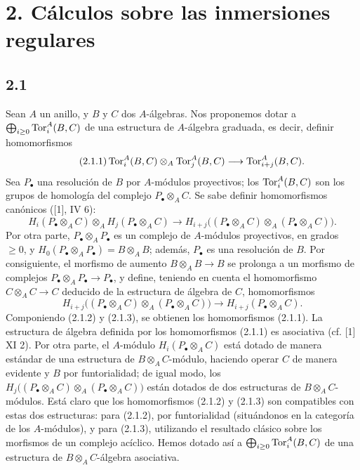 \providecommand{\sisi}[2]{#2}

\section*{2. Cálculos sobre las inmersiones regulares}

\subsection*{2.1}
Sean \(A\) un anillo, y \(B\) y \(C\) dos \(A\)-álgebras. Nos proponemos dotar a \(\bigoplus_{i\ge0}\operatorname{Tor}_i^A(B,C)\) de una estructura de \(A\)-álgebra graduada, es decir, definir homomorfismos
\begin{equation}\tag{2.1.1}
 \operatorname{Tor}_i^A(B,C)\otimes_A\operatorname{Tor}_j^A(B,C)\longrightarrow \operatorname{Tor}_{i+j}^A(B,C).
\end{equation}
Sea \(P_\bullet\) una resolución de \(B\) por \(A\)-módulos proyectivos; los \(\operatorname{Tor}_i^A(B,C)\) son los grupos de homología del complejo \(P_\bullet\otimes_A C\). Se sabe definir homomorfismos canónicos ([1], IV 6):
\begin{equation}\tag{2.1.2}
 H_i(P_\bullet\otimes_A C)\otimes_A H_j(P_\bullet\otimes_A C)
 \longrightarrow H_{i+j}\bigl((P_\bullet\otimes_A C)\otimes_A(P_\bullet\otimes_A C)\bigr).
\end{equation}
Por otra parte, \(P_\bullet\otimes_A P_\bullet\) es un complejo de \(A\)-módulos proyectivos, en grados \(\geq0\), y \(H_0(P_\bullet\otimes_A P_\bullet)=B\otimes_A B\); además, \(P_\bullet\) es una resolución de \(B\). Por consiguiente, el morfismo de aumento \(B\otimes_A B\to B\) se prolonga a un morfismo de complejos \(P_\bullet\otimes_A P_\bullet\to P_\bullet\), y define, teniendo en cuenta el homomorfismo \(C\otimes_A C\to C\) deducido de la estructura de álgebra de \(C\), homomorfismos
\begin{equation}\tag{2.1.3}
 H_{i+j}\bigl((P_\bullet\otimes_A C)\otimes_A(P_\bullet\otimes_A C)\bigr)
 \longrightarrow H_{i+j}(P_\bullet\otimes_A C).
\end{equation}
Componiendo (2.1.2) y (2.1.3), se obtienen los homomorfismos (2.1.1). La estructura de álgebra definida por los homomorfismos (2.1.1) es asociativa (cf. [1] XI 2). Por otra parte, el \(A\)-módulo \(H_i(P_\bullet\otimes_A C)\) está dotado de manera estándar de una estructura de \(B\otimes_A C\)-módulo, haciendo operar \(C\) de manera evidente y \(B\) por funtorialidad; de igual modo, los \(H_j\bigl((P_\bullet\otimes_A C)\otimes_A(P_\bullet\otimes_A C)\bigr)\) están dotados de dos estructuras de \(B\otimes_A C\)-módulos. Está claro que los homomorfismos (2.1.2) y (2.1.3) son compatibles con estas dos estructuras: para (2.1.2), por funtorialidad (situándonos en la categoría de los \(A\)-módulos), y para (2.1.3), utilizando el resultado clásico sobre los morfismos de un complejo acíclico. Hemos dotado así a \(\bigoplus_{i\ge0}\operatorname{Tor}_i^A(B,C)\) de una estructura de \(B\otimes_A C\)-álgebra asociativa.

